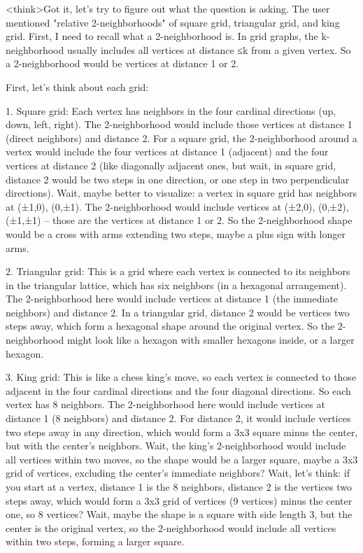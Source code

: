 <think>Got it, let's try to figure out what the question is asking. The user mentioned "relative 2-neighborhoods" of square grid, triangular grid, and king grid. First, I need to recall what a 2-neighborhood is. In grid graphs, the k-neighborhood usually includes all vertices at distance ≤k from a given vertex. So a 2-neighborhood would be vertices at distance 1 or 2. 

First, let's think about each grid:

1. Square grid: Each vertex has neighbors in the four cardinal directions (up, down, left, right). The 2-neighborhood would include those vertices at distance 1 (direct neighbors) and distance 2. For a square grid, the 2-neighborhood around a vertex would include the four vertices at distance 1 (adjacent) and the four vertices at distance 2 (like diagonally adjacent ones, but wait, in square grid, distance 2 would be two steps in one direction, or one step in two perpendicular directions). Wait, maybe better to visualize: a vertex in square grid has neighbors at (±1,0), (0,±1). The 2-neighborhood would include vertices at (±2,0), (0,±2), (±1,±1) – those are the vertices at distance 1 or 2. So the 2-neighborhood shape would be a cross with arms extending two steps, maybe a plus sign with longer arms.

2. Triangular grid: This is a grid where each vertex is connected to its neighbors in the triangular lattice, which has six neighbors (in a hexagonal arrangement). The 2-neighborhood here would include vertices at distance 1 (the immediate neighbors) and distance 2. In a triangular grid, distance 2 would be vertices two steps away, which form a hexagonal shape around the original vertex. So the 2-neighborhood might look like a hexagon with smaller hexagons inside, or a larger hexagon.

3. King grid: This is like a chess king's move, so each vertex is connected to those adjacent in the four cardinal directions and the four diagonal directions. So each vertex has 8 neighbors. The 2-neighborhood here would include vertices at distance 1 (8 neighbors) and distance 2. For distance 2, it would include vertices two steps away in any direction, which would form a 3x3 square minus the center, but with the center's neighbors. Wait, the king's 2-neighborhood would include all vertices within two moves, so the shape would be a larger square, maybe a 3x3 grid of vertices, excluding the center's immediate neighbors? Wait, let's think: if you start at a vertex, distance 1 is the 8 neighbors, distance 2 is the vertices two steps away, which would form a 3x3 grid of vertices (9 vertices) minus the center one, so 8 vertices? Wait, maybe the shape is a square with side length 3, but the center is the original vertex, so the 2-neighborhood would include all vertices within two steps, forming a larger square.


